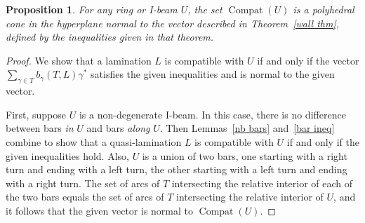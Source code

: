 \documentclass{amsart}
\newtheorem{prop}[proposition]{Proposition}
\theoremstyle{definition}
\theoremstyle{remark}
\numberwithin{equation}{section}
\newcommand{\0}{{\mathbf{0}}}
\newcommand{\Compat}{\operatorname{Compat}}
\begin{document}
\begin{prop}\label{all but codim}
For any ring or I-beam $U$, the set $\Compat(U)$ is a polyhedral cone in the hyperplane normal to the vector described in Theorem~\ref{wall thm}, defined by the inequalities given in that theorem.
\end{prop}
\begin{proof}
We show that a lamination $L$ is compatible with $U$ if and only if the vector $\sum_{\gamma\in T}b_\gamma(T,L)\gamma^*$ satisfies the given inequalities and is normal to the given vector.

First, suppose $U$ is a non-degenerate I-beam.
In this case, there is no difference between bars \emph{in} $U$ and bars \emph{along} $U$.
Then Lemmas~\ref{nb bars} and~\ref{bar ineq} combine to show that a quasi-lamination $L$ is compatible with $U$ if and only if the given inequalities hold.
Also, $U$ is a union of two bars, one starting with a right turn and ending with a left turn, the other starting with a left turn and ending with a right turn.
The set of arcs of $T$ intersecting the relative interior of each of the two bars equals the set of arcs of $T$ intersecting the relative interior of $U$, and it follows that the given vector is normal to $\Compat(U)$.


\end{proof}
\end{document}
